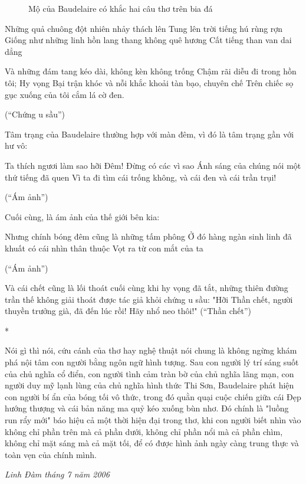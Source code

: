\documentclass[../main.tex]{subfiles}
\begin{document}
\begin{multicols}{2}
\begin{figure}
	\caption{Mộ của Baudelaire có khắc hai câu thơ trên bia đá}
\end{figure}
 \begin{blockquote}
        
Những quả chuông đột nhiên nhảy thách lên        
Tung lên trời tiếng hú rùng rợn        
Giống như những linh hồn lang thang không quê hương        
Cất tiếng than van dai dẳng 
        
Và những đám tang kéo dài, không kèn không trống        
Chậm rãi diễu đi trong hồn tôi; Hy vọng        
Bại trận khóc và nỗi khắc khoải tàn bạo, chuyên chế        
Trên chiếc sọ gục xuống của tôi cắm lá cờ đen. 
        
(“Chứng u sầu”) 

\end{blockquote}
 
Tâm trạng của Baudelaire thường hợp với màn đêm, vì đó là tâm trạng gần với hư vô: 
\begin{blockquote}
        
Ta thích ngươi làm sao hỡi Đêm! Đừng có các vì sao        
Ánh sáng của chúng nói một thứ tiếng đã quen        
Vì ta đi tìm cái trống không, và cái đen và cái trần trụi!        
        
(“Ám ảnh”) 

\end{blockquote}
 
Cuối cùng, là ám ảnh của thế giới bên kia: 
\begin{blockquote}
        
Nhưng chính bóng đêm cũng là những tấm phông        
Ở đó hàng ngàn sinh linh đã khuất có cái nhìn thân thuộc        
Vọt ra từ con mắt của ta         
        
(“Ám ảnh”) 

\end{blockquote}
 
 
  Và cái chết cũng là lối thoát cuối cùng khi hy vọng đã tắt, những thiên đường trần thế không giải thoát được tác giả khỏi chứng u sầu: "Hỡi Thần chết, người thuyền trưởng già, đã đến lúc rồi! Hãy nhổ neo thôi!" (“Thần chết”) 
        
\begin{center}
*\end{center}
 
Nói gì thì nói, cứu cánh của thơ hay nghệ thuật nói chung là không ngừng khám phá nội tâm con người bằng ngôn ngữ hình tượng. Sau con người lý trí sáng suốt của chủ nghĩa cổ điển, con người tình cảm tràn bờ của chủ nghĩa lãng mạn, con người duy mỹ lạnh lùng của chủ nghĩa hình thức Thi Sơn, Baudelaire phát hiện con người bí ẩn của bóng tối vô thức, trong đó quằn quại cuộc chiến giữa cái Đẹp hướng thượng và cái bản năng ma quỷ kéo xuống bùn nhơ. Đó chính là "luồng run rẩy mới" báo hiệu cả một thời hiện đại trong thơ, khi con người biết nhìn vào không chỉ phần trên mà cả phần dưới, không chỉ phần nổi mà cả phần chìm, không chỉ mặt sáng mà cả mặt tối, để có được hình ảnh ngày càng trung thực và toàn vẹn của chính mình. 
 
\textit{Linh Đàm tháng 7 năm 2006} 
\end{multicols}
\end{document}
